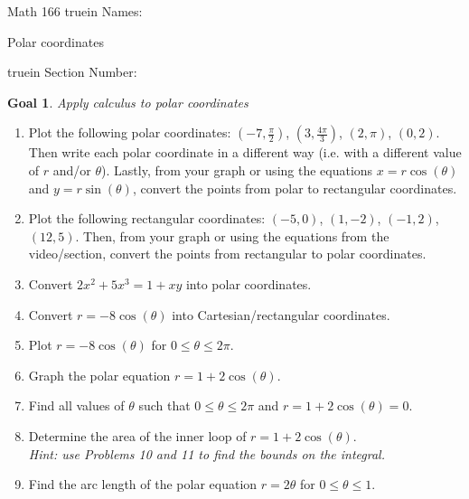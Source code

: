 \documentclass[12pt]{article}
\newtheorem*{goal}{Goal}
\begin{document}
\pagestyle{empty} %

\noindent
{Math 166  truein  Names:\ \hrulefill}

\noindent
{Polar coordinates}

\noindent  {} truein  Section Number:\ \hrulefill
\medskip

\begin{goal} \rm
Apply calculus to polar coordinates
\end{goal}

\begin{enumerate}
\item  Plot the following polar coordinates:  $(-7, \frac{\pi}{2})$, $(3, \frac{4\pi}{3})$, $(2, \pi)$, $(0, 2)$. Then write
each polar coordinate in a different way (i.e. with a different value of $r$ and/or $\theta$).
Lastly, from your graph or using the equations $x = r \cos(\theta)$ and $y = r \sin (\theta)$, convert the points from polar to rectangular coordinates.
\vfill
\item Plot the following rectangular coordinates: $(-5, 0)$, $(1, -2)$, $(-1, 2)$, $(12, 5)$. 
Then, from your graph or using the equations from the video/section, convert the points from rectangular to polar coordinates. 
\vfill
\pagebreak
\item Convert $2x^2+5x^3=1+xy$ into polar coordinates. 
\vfill
\item   Convert $r = -8\cos(\theta)$ into Cartesian/rectangular coordinates.
\vfill
\item  Plot $r = -8\cos(\theta)$ for $0\leq \theta \leq 2\pi$.
\vfill
\pagebreak
\item Graph the polar equation $r = 1+2 \cos(\theta)$.
\vfill
\item Find all values of $\theta$ such that $0\leq \theta\leq 2\pi$ and $r = 1+2 \cos(\theta) = 0$.
\vfill
\pagebreak
\item  Determine the area of the inner loop of 
$r=1+2 \cos(\theta)$.
\\
\textit{Hint: use Problems 10 and 11 to find the bounds on the integral.}
\vfill
\item  Find the arc length of the polar equation $r = 2\theta$ for $0 \leq \theta \leq 1$.
\vfill
\end{enumerate} 
\end{document}
